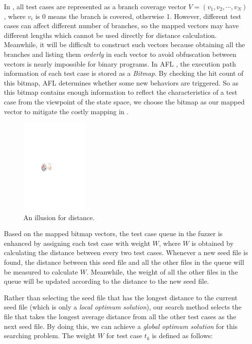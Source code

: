 In \cite{wang2015similarity}, all test cases are represented as a branch coverage vector $\mathit{V}=(v_1, v_2, \cdots, v_N)$, where $v_i$ is 0 means the branch is covered, otherwise 1. 
However, different test cases can affect different number of branches, so the mapped vectors may have different lengths which cannot be used directly for distance calculation. Meanwhile, it will be difficult to construct such vectors because obtaining all the branches and listing them \textit{orderly} in each vector to avoid obfuscation between vectors is nearly impossible for binary programs. 
In AFL \cite{online:afl}, the execution path information of each test case is stored as a \emph{Bitmap}. By checking the hit count of this bitmap, AFL determines whether some new behaviors are triggered. So as this bitmap contains enough information to reflect the characteristics of a test case from the viewpoint of the state space, we choose the bitmap as our mapped vector to mitigate the costly mapping in \cite{wang2015similarity}.

\begin{figure}
\centering
\includegraphics[width=0.3\textwidth]{figures/distance-illusion.pdf} 
\caption{An illusion for distance.}\label{distance-illusion}
\end{figure}

Based on the mapped bitmap vectors, the test case queue in the fuzzer is enhanced by assigning each test case with weight $W$, where $W$ is obtained by calculating the distance between every two test cases. Whenever a new seed file is found, the distance between this seed file and all the other files in the queue will be measured to calculate $W$. Meanwhile, the weight of all the other files in the queue will be updated according to the distance to the new seed file. 

Rather than selecting the seed file that has the longest distance to the current seed file (which is only a \emph{local optimum solution}), our search method selects the file that takes the longest average distance from all the other test cases as the next seed file. By doing this, we can achieve a \emph{global optimum solution} for this searching problem. The weight $W$ for test case $t_k$ is defined as follows:

